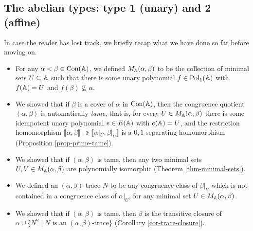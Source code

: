 \begin{appendices}




\section{The abelian types: type \textbf{1} (unary) and \textbf{2} (affine)}

In case the reader has lost track, we briefly recap what we have done so far before moving on.
\begin{itemize}
\item For any $\alpha < \beta \in \operatorname{Con}(\mathbb{A})$, we defined $M_{\mathbb{A}}(\alpha, \beta)$ to be the collection of minimal sets $U \subseteq \mathbb{A}$ such that there is some unary polynomial $f \in \operatorname{Pol}_1(\mathbb{A})$ with $f(\mathbb{A}) = U$ and $f(\beta) \not\subseteq \alpha$.

\item We showed that if $\beta$ is a cover of $\alpha$ in $\operatorname{Con}(\mathbb{A})$, then the congruence quotient $(\alpha, \beta)$ is automatically \emph{tame}, that is, for every $U \in M_{\mathbb{A}}(\alpha, \beta)$ there is some idempotent unary polynomial $e \in E(\mathbb{A})$ with $e(\mathbb{A}) = U$, and the restriction homomorphism $\llbracket \alpha, \beta \rrbracket \twoheadrightarrow \llbracket \alpha|_U, \beta|_U \rrbracket$ is a $0,1$-separating homomorphism (Proposition \ref{prop-prime-tame}).

\item We showed that if $(\alpha, \beta)$ is tame, then any two minimal sets $U, V \in M_{\mathbb{A}}(\alpha, \beta)$ are polynomially isomorphic (Theorem \ref{thm-minimal-sets}).

\item We defined an $(\alpha, \beta)$-trace $N$ to be any congruence class of $\beta|_U$ which is not contained in a congruence class of $\alpha|_U$, for any minimal set $U \in M_{\mathbb{A}}(\alpha, \beta)$.

\item We showed that if $(\alpha, \beta)$ is tame, then $\beta$ is the transitive closure of $\alpha \cup \{N^2 \mid N \text{ is an }(\alpha,\beta)\text{-trace}\}$ (Corollary \ref{cor-trace-closure}).


\end{itemize}
\end{appendices}

